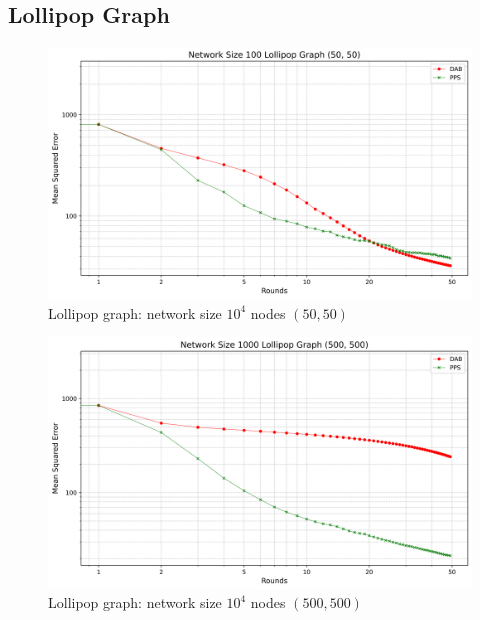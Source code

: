 \subsection{Lollipop Graph}
\begin{figure}[H]
    \centering
    \includegraphics[scale=0.5]{figures/lollipopGraphSimulations/DAB_vs_PPS_LG_r50_n100.png}
    \caption{Lollipop graph: network size $10^{4}$ nodes $(50, 50)$}
    \label{fig:50+50lollipopgraph}
\end{figure}
\begin{figure}[H]
    \centering
    \includegraphics[scale=0.5]{figures/lollipopGraphSimulations/DAB_vs_PPS_LG_r50_n1000.png}
    \caption{Lollipop graph: network size $10^{4}$ nodes $(500, 500)$}
    \label{fig:500+500lollipopgraph}
\end{figure}
